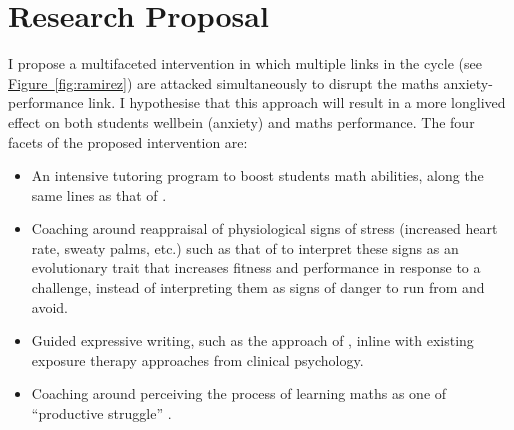 \documentclass[14pt]{memoir}
\newcommand{\reffig}[1]{\hyperref[fig:#1]{Figure~\ref{fig:#1}}}
\begin{document}
%



\section{Research Proposal}

I propose a multifaceted intervention in which multiple links in the cycle (see \reffig{ramirez}) are attacked simultaneously to disrupt the maths anxiety-performance link. I hypothesise that this approach will result in a more longlived effect on both students wellbein (anxiety) and maths performance. The four facets of the proposed intervention are:
\begin{itemize}
	\item An intensive tutoring program to boost students math abilities, along the same lines as that of .
	\item Coaching around reappraisal of physiological signs of stress (increased heart rate, sweaty palms, etc.) such as that of  to interpret these signs as an evolutionary trait that increases fitness and performance in response to a challenge, instead of interpreting them as signs of danger to run from and avoid.
	\item Guided expressive writing, such as the approach of , inline with existing exposure therapy approaches from clinical psychology.
	\item Coaching around perceiving the process of learning maths as one of ``productive struggle'' \cite{Hiebert2007}.
\end{itemize}
\end{document}
